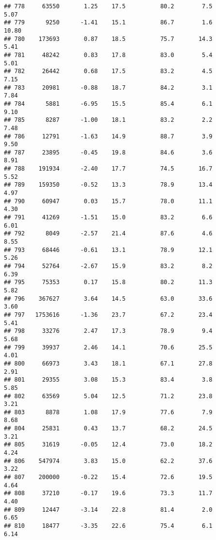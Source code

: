 \documentclass[
]{article}
\begin{document}
\begin{verbatim}
## 778     63550       1.25    17.5          80.2        7.5              5.07
## 779      9250      -1.41    15.1          86.7        1.6             10.80
## 780    173693       0.87    18.5          75.7       14.3              5.41
## 781     48242       0.83    17.8          83.0        5.4              5.01
## 782     26442       0.68    17.5          83.2        4.5              7.15
## 783     20981      -0.88    18.7          84.2        3.1              7.84
## 784      5881      -6.95    15.5          85.4        6.1              9.10
## 785      8287      -1.00    18.1          83.2        2.2              7.48
## 786     12791      -1.63    14.9          88.7        3.9              9.50
## 787     23895      -0.45    19.8          84.6        3.6              8.91
## 788    191934      -2.40    17.7          74.5       16.7              5.52
## 789    159350      -0.52    13.3          78.9       13.4              4.97
## 790     60947       0.03    15.7          78.0       11.1              4.30
## 791     41269      -1.51    15.0          83.2        6.6              6.01
## 792      8049      -2.57    21.4          87.6        4.6              8.55
## 793     68446      -0.61    13.1          78.9       12.1              5.26
## 794     52764      -2.67    15.9          83.2        8.2              6.39
## 795     75353       0.17    15.8          80.2       11.3              5.82
## 796    367627       3.64    14.5          63.0       33.6              3.60
## 797   1753616      -1.36    23.7          67.2       23.4              5.41
## 798     33276       2.47    17.3          78.9        9.4              5.68
## 799     39937       2.46    14.1          70.6       25.5              4.01
## 800     66973       3.43    18.1          67.1       27.8              2.91
## 801     29355       3.08    15.3          83.4        3.8              5.85
## 802     63569       5.04    12.5          71.2       23.8              3.21
## 803      8878       1.08    17.9          77.6        7.9              8.68
## 804     25831       0.43    13.7          68.2       24.5              3.21
## 805     31619      -0.05    12.4          73.0       18.2              4.24
## 806    547974       3.83    15.0          62.2       37.6              3.22
## 807    200000      -0.22    15.4          72.6       19.5              4.64
## 808     37210      -0.17    19.6          73.3       11.7              4.40
## 809     12447      -3.14    22.8          81.4        2.0              6.65
## 810     18477      -3.35    22.6          75.4        6.1              6.14

\end{verbatim}
\end{document}
